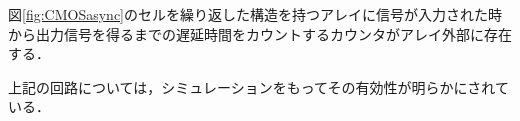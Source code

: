 \begin{itemize}
図\ref{fig:CMOSasync}のセルを繰り返した構造を持つアレイに信号が入力された時から出力信号を得るまでの遅延時間をカウントするカウンタがアレイ外部に存在する．
\end{itemize}
上記の回路については，シミュレーションをもってその有効性が明らかにされている．

